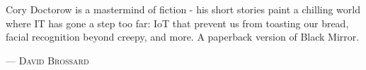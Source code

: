 Cory Doctorow is a mastermind of fiction - his short stories paint a chilling world where IT has gone a step too far: IoT that prevent us from toasting our bread, facial recognition beyond creepy, and more. A paperback version of Black Mirror.
\setlength{\parindent}{0cm}\par\textsc{ --- David Brossard }\par\vspace{12pt}\setlength{\parindent}{15pt}
